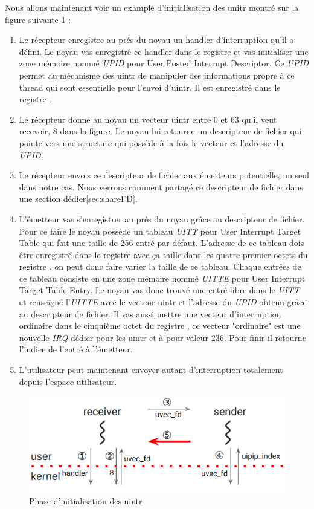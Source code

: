 Nous allons maintenant voir un example d'initialisation des unitr montré sur la figure suivante \ref{fig:initUintr} :

\begin{enumerate}[label=\protect\circled{\arabic*}]
  \item Le récepteur enregistre au prés du noyau un handler d'interruption qu'il a défini.
  Le noyau vas enregistré ce handler dans le registre  et vas initialiser une zone mémoire nommé \emph{UPID} pour User Posted Interrupt Descriptor.
  Ce \emph{UPID} permet au mécanisme des uintr de manipuler des informations propre à ce thread qui sont essentielle pour l'envoi d'uintr.
  Il est enregistré dans le registre .
  \item Le récepteur donne au noyau un vecteur uintr entre 0 et 63 qu'il veut recevoir, 8 dans la figure. Le noyau lui retourne un descripteur de fichier qui pointe vers une structure qui possède à la fois le vecteur et l'adresse du \emph{UPID}.
  \item Le récepteur envois ce descripteur de fichier aux émetteurs potentielle, un seul dans notre cas. Nous verrons comment partagé ce descripteur de fichier dans une section dédier\ref{sec:shareFD}.
  \item L'émetteur vas s'enregistrer au prés du noyau grâce au descripteur de fichier.
  Pour ce faire le noyau possède un tableau \emph{UITT} pour User Interrupt Target Table qui fait une taille de 256 entré par défaut.
  L'adresse de ce tableau dois être enregistré dans le registre  avec ça taille dans les quatre premier octets du registre , on peut donc faire varier la taille de ce tableau.
  Chaque entrées de ce tableau consiste en une zone mémoire nommé \emph{UITTE} pour User Interrupt Target Table Entry.
  Le noyau vas donc trouvé une entré libre dans le \emph{UITT} et renseigné l'\emph{UITTE} avec le vecteur uintr et l'adresse du \emph{UPID} obtenu grâce au descripteur de fichier.
  Il vas aussi mettre une vecteur d'interruption ordinaire dans le cinquième octet du registre , ce vecteur "ordinaire" est une nouvelle \emph{IRQ} dédier pour les uintr et à pour valeur 236.
  Pour finir il retourne l'indice de l'entré à l'émetteur.
  \item L'utilisateur peut maintenant envoyer autant d'interruption totalement depuis l'espace utilisateur.
\end{enumerate}

\begin{figure}[H]
  \includegraphics[width=\textwidth]{images/uintrInit.png}
  \caption{Phase d'initialisation des uintr}
  \label{fig:initUintr}
\end{figure}


